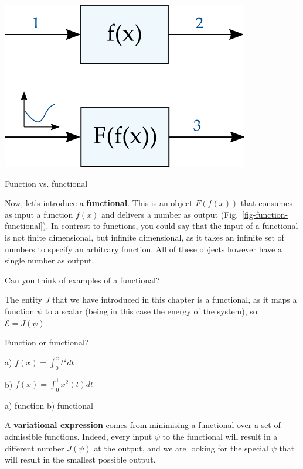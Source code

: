 \begin{marginfigure}[-1.5cm]
  \includegraphics{numeric/figures/function_functional}
  \caption{Function vs. functional}
  \label{fig-function-functional}
\end{marginfigure}

Now, let's introduce a \textbf{functional}. This is an object $F(f(x))$ that consumes as input a function $f(x)$ and delivers a number as output (Fig.~\ref{fig-function-functional}). In contrast to functions, you could say that the input of a functional is not finite dimensional, but infinite dimensional, as it takes an infinite set of numbers to specify an arbitrary function. All of these objects however have a single number as output.

\begin{cue}
Can you think of examples of a functional?  
\end{cue}

The entity $J$ that we have introduced in this chapter is a functional, as it maps a function $\psi$ to a scalar (being in this case the energy of the system), so $\mathcal{E}=J(\psi)$.

\begin{exer}
  Function or functional?

  a) $f(x)=\int_0^x t^2 dt$

  b) $f(x)=\int_0^1 x^2(t) dt$
  \begin{sol}
    a) function b) functional
  \end{sol}
\end{exer}

A \textbf{variational expression} comes from minimising a functional over a set of admissible functions. Indeed, every input $\psi$ to the functional will result in a different number $J(\psi)$ at the output, and we are looking for the special $\psi$ that will result in the smallest possible output.

